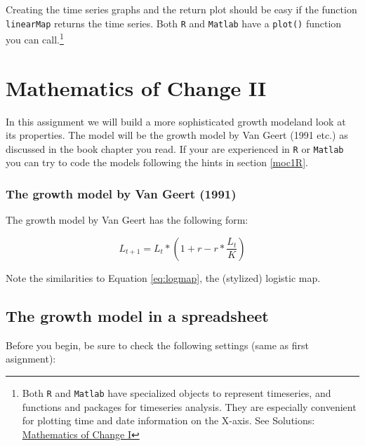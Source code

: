 \documentclass[]{book}
\let\rmarkdownfootnote\footnote%
\def\footnote{\protect\rmarkdownfootnote}
\let\stdsection\section
\renewcommand\section{\newpage\stdsection}
\begin{document}
Creating the time series graphs and the return plot should be easy if
the function \texttt{linearMap} returns the time series. Both \texttt{R}
and \texttt{Matlab} have a \texttt{plot()} function you can
call.\footnote{Both \texttt{R} and \texttt{Matlab} have specialized
  objects to represent timeseries, and functions and packages for
  timeseries analysis. They are especially convenient for plotting time
  and date information on the X-axis. See Solutions:
  \protect\hyperlink{moc1Rsol}{Mathematics of Change I}}

\chapter{Mathematics of Change II}\label{moc2ass}

In this assignment we will build a more sophisticated growth modeland
look at its properties. The model will be the growth model by Van Geert
(1991 etc.) as discussed in the book chapter you read. If your are
experienced in \texttt{R} or \texttt{Matlab} you can try to code the
models following the hints in section \ref{moc1R}.

\subsection{The growth model by Van Geert
(1991)}\label{the-growth-model-by-van-geert-1991}

The growth model by Van Geert has the following form:

\begin{equation}
L_{t+1} = L_t * (1 + r - r * \frac{L_t}{K})
\label{eq:vanG}
\end{equation}

Note the similarities to Equation \eqref{eq:logmap}, the (stylized)
logistic map.

\section{The growth model in a
spreadsheet}\label{the-growth-model-in-a-spreadsheet}

Before you begin, be sure to check the following settings (same as first
asignment):
\end{document}
